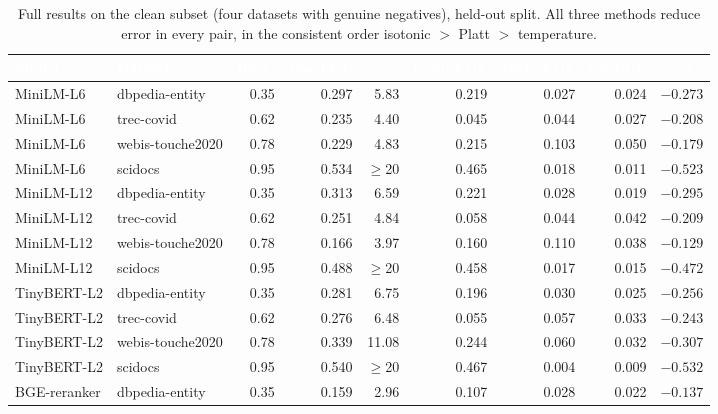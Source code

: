 \documentclass[sn-mathphys-num,pdflatex]{sn-jnl}
\newcommand{\thead}[1]{\textcolor{white}{\textbf{#1}}}
\begin{document}
\begin{table}[t]
\centering
\caption{Full results on the clean subset (four datasets with genuine negatives),
held-out split. All three methods reduce error in every pair, in the consistent
order isotonic $>$ Platt $>$ temperature.}\label{tab:clean}
\scriptsize
\setlength{\tabcolsep}{3.5pt}
\begin{tabular}{llrrrrrrr}
\toprule
\rowcolor{headblue}
\thead{Model} & \thead{Dataset} & \thead{Prev.} & \thead{raw ECE} & \thead{$T$} & \thead{temp ECE} & \thead{Platt ECE} & \thead{iso ECE} & \thead{$\Delta_{\text{iso}}$} \\
\midrule
\rowcolor{rowlight}
MiniLM-L6   & dbpedia-entity   & 0.35 & 0.297 & 5.83  & 0.219 & 0.027 & 0.024 & $-0.273$ \\
\rowcolor{rowwhite}
MiniLM-L6   & trec-covid       & 0.62 & 0.235 & 4.40  & 0.045 & 0.044 & 0.027 & $-0.208$ \\
\rowcolor{rowlight}
MiniLM-L6   & webis-touche2020 & 0.78 & 0.229 & 4.83  & 0.215 & 0.103 & 0.050 & $-0.179$ \\
\rowcolor{rowwhite}
MiniLM-L6   & scidocs          & 0.95 & 0.534 & $\geq$20 & 0.465 & 0.018 & 0.011 & $-0.523$ \\
\rowcolor{rowlight}
MiniLM-L12  & dbpedia-entity   & 0.35 & 0.313 & 6.59  & 0.221 & 0.028 & 0.019 & $-0.295$ \\
\rowcolor{rowwhite}
MiniLM-L12  & trec-covid       & 0.62 & 0.251 & 4.84  & 0.058 & 0.044 & 0.042 & $-0.209$ \\
\rowcolor{rowlight}
MiniLM-L12  & webis-touche2020 & 0.78 & 0.166 & 3.97  & 0.160 & 0.110 & 0.038 & $-0.129$ \\
\rowcolor{rowwhite}
MiniLM-L12  & scidocs          & 0.95 & 0.488 & $\geq$20 & 0.458 & 0.017 & 0.015 & $-0.472$ \\
\rowcolor{rowlight}
TinyBERT-L2 & dbpedia-entity   & 0.35 & 0.281 & 6.75  & 0.196 & 0.030 & 0.025 & $-0.256$ \\
\rowcolor{rowwhite}
TinyBERT-L2 & trec-covid       & 0.62 & 0.276 & 6.48  & 0.055 & 0.057 & 0.033 & $-0.243$ \\
\rowcolor{rowlight}
TinyBERT-L2 & webis-touche2020 & 0.78 & 0.339 & 11.08 & 0.244 & 0.060 & 0.032 & $-0.307$ \\
\rowcolor{rowwhite}
TinyBERT-L2 & scidocs          & 0.95 & 0.540 & $\geq$20 & 0.467 & 0.004 & 0.009 & $-0.532$ \\
\rowcolor{rowlight}
BGE-reranker& dbpedia-entity   & 0.35 & 0.159 & 2.96  & 0.107 & 0.028 & 0.022 & $-0.137$ \\

\end{tabular}
\end{table}
\end{document}
